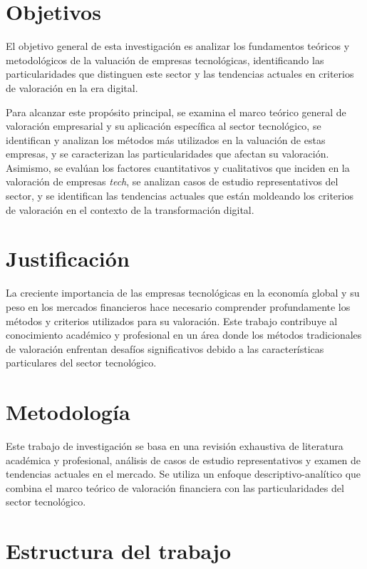 \section{Objetivos}

El objetivo general de esta investigación es analizar los fundamentos teóricos y metodológicos de la valuación de empresas tecnológicas, identificando las particularidades que distinguen este sector y las tendencias actuales en criterios de valoración en la era digital.

Para alcanzar este propósito principal, se examina el marco teórico general de valoración empresarial y su aplicación específica al sector tecnológico, se identifican y analizan los métodos más utilizados en la valuación de estas empresas, y se caracterizan las particularidades que afectan su valoración. Asimismo, se evalúan los factores cuantitativos y cualitativos que inciden en la valoración de empresas \emph{tech}, se analizan casos de estudio representativos del sector, y se identifican las tendencias actuales que están moldeando los criterios de valoración en el contexto de la transformación digital.

\section{Justificación}

La creciente importancia de las empresas tecnológicas en la economía global y su peso en los mercados financieros hace necesario comprender profundamente los métodos y criterios utilizados para su valoración. Este trabajo contribuye al conocimiento académico y profesional en un área donde los métodos tradicionales de valoración enfrentan desafíos significativos debido a las características particulares del sector tecnológico.

\section{Metodología}

Este trabajo de investigación se basa en una revisión exhaustiva de literatura académica y profesional, análisis de casos de estudio representativos y examen de tendencias actuales en el mercado. Se utiliza un enfoque descriptivo-analítico que combina el marco teórico de valoración financiera con las particularidades del sector tecnológico.

\section{Estructura del trabajo}

